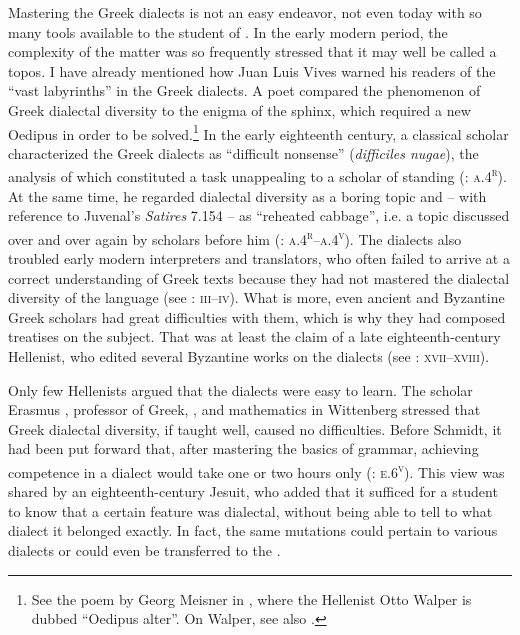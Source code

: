 Mastering the Greek dialects is not an easy endeavor, not even today with so many tools available to the student of . In the early modern period, the complexity of the matter was so frequently stressed that it may well be called a topos. I have already mentioned how Juan Luis Vives warned his readers of the “vast labyrinths” in the Greek dialects. A  poet compared the phenomenon of Greek dialectal diversity to the enigma of the sphinx, which required a new Oedipus in order to be solved.\footnote{See the poem by Georg Meisner in \citet[††.2\textsc{\textsuperscript{r}}]{Walper1589}, where the Hellenist Otto Walper is dubbed “Oedipus alter”. On Walper, see also \citet[]{VanRooyFcc}.} In the early eighteenth century, a  classical scholar characterized the Greek dialects as “difficult nonsense” (\textit{difficiles nugae}), the analysis of which constituted a task unappealing to a scholar of standing (\citealt{Maittaire1706}: \textsc{a.4}\textsc{\textsuperscript{r}}). At the same time, he regarded dialectal diversity as a boring topic and – with reference to Juvenal’s \textit{Satires} 7.154 – as “reheated cabbage”, i.e. a topic discussed over and over again by scholars before him (\citealt{Maittaire1706}: \textsc{a.4}\textsc{\textsuperscript{r}}--\textsc{a.4}\textsc{\textsuperscript{v}}). The dialects also troubled early modern interpreters and translators, who often failed to arrive at a correct understanding of Greek texts because they had not mastered the dialectal diversity of the language (see \citealt{Facius1782}: \textsc{iii–iv}). What is more, even ancient and Byzantine Greek scholars had great difficulties with them, which is why they had composed treatises on the subject. That was at least the claim of a late eighteenth-century  Hellenist, who edited several Byzantine works on the dialects (see \citealt{Koen1766}: \textsc{xvii–xviii}).

Only few Hellenists argued that the dialects were easy to learn. The  scholar Erasmus \citet[):(.2\textsc{\textsuperscript{r}}]{Schmidt1604}, professor of Greek, , and mathematics in Wittenberg stressed that Greek dialectal diversity, if taught well, caused no difficulties. Before Schmidt, it had been put forward that, after mastering the basics of grammar, achieving competence in a dialect would take one or two hours only (\citealt{Caselius1560}: \textsc{e.6}\textsc{\textsuperscript{v}}). This view was shared by an eighteenth-century  Jesuit, who added that it sufficed for a student to know that a certain feature was dialectal, without being able to tell to what dialect it belonged exactly. In fact, the same mutations could pertain to various dialects or could even be transferred to the  \citep[101]{Giraudeau1739}.

